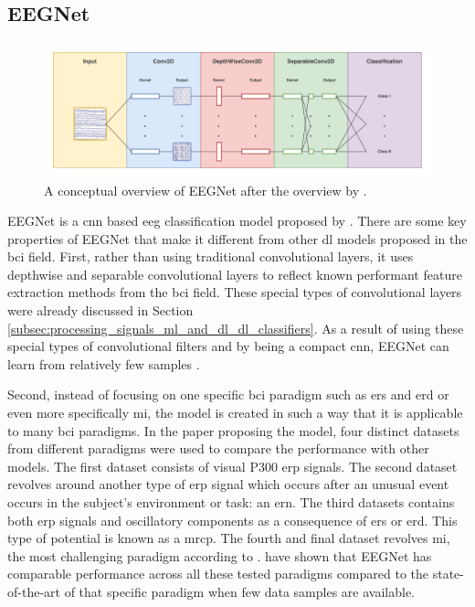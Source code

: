 \subsection{EEGNet}
\label{subsec:offline_bci_system_one_step_dl_eegnet}

\begin{figure}[t]
    \centering
    \includegraphics[width=\linewidth]{../images/pipeline/eegnet_intuitive.pdf}
    \captionsetup{width=0.8\linewidth}
    \captionsetup{justification=centering}
    \caption{A conceptual overview of EEGNet after the overview by \citet{eeg_model_eegnet}.}
    \label{fig:offline_bci_system_dl_eegnet_intuitive}
\end{figure}

EEGNet is a \gls{cnn} based \gls{eeg} classification model proposed by \citet{eeg_model_eegnet}.
There are some key properties of EEGNet that make it different from other \gls{dl} models proposed in the \gls{bci} field.
First, rather than using traditional convolutional layers, it uses depthwise and separable convolutional layers to reflect known performant feature extraction methods from the \gls{bci} field.
These special types of convolutional layers were already discussed in Section \ref{subsec:processing_signals_ml_and_dl_dl_classifiers}.
As a result of using these special types of convolutional filters and by being a compact \gls{cnn}, EEGNet can learn from relatively few samples \citep{eeg_model_eegnet}.

Second, instead of focusing on one specific \gls{bci} paradigm such as \gls{ers} and \gls{erd} or even more specifically \gls{mi}, the model is created in such a way that it is applicable to many \gls{bci} paradigms.
In the paper proposing the model, four distinct datasets from different paradigms were used to compare the performance with other models.
The first dataset consists of visual P300 \gls{erp} signals.
The second dataset revolves around another type of \gls{erp} signal which occurs after an unusual event occurs in the subject's environment or task: an \gls{ern}.
The third datasets contains both \gls{erp} signals and oscillatory components as a consequence of \gls{ers} or \gls{erd}.
This type of potential is known as a \gls{mrcp}.
The fourth and final dataset revolves \gls{mi}, the most challenging paradigm according to \citet{eeg_model_eegnet}.
\citet{eeg_model_eegnet} have shown that EEGNet has comparable performance across all these tested paradigms compared to the state-of-the-art of that specific paradigm when few data samples are available.


